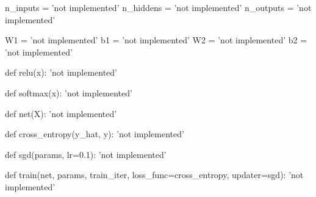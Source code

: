 \documentclass[submit]{harvardml}
\begin{document}
\begin{python}
n_inputs = 'not implemented'
n_hiddens = 'not implemented'
n_outputs = 'not implemented'

W1 = 'not implemented'
b1 = 'not implemented'
W2 = 'not implemented'
b2 = 'not implemented'



def relu(x):
    'not implemented'



def softmax(x):
    'not implemented'



def net(X):
  'not implemented'



def cross_entropy(y_hat, y):
  'not implemented'



def sgd(params, lr=0.1):
  'not implemented'



def train(net, params, train_iter, loss_func=cross_entropy, updater=sgd):
  'not implemented'

\end{python}
\end{document}
